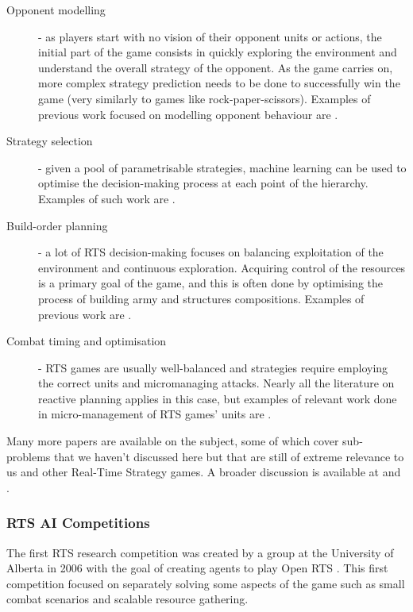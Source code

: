 \begin{description}
\item [Opponent modelling] - as players start with no vision of their opponent
  units or actions, the initial part of the game consists in quickly exploring
  the environment and understand the overall strategy of the opponent. As the
  game carries on, more complex strategy prediction needs to be done to
  successfully win the game (very similarly to games like rock-paper-scissors). 
  Examples of previous work focused on modelling opponent behaviour are
  \cite{dereszynski2011learning, schadd2007opponent, synnaeve2012special}.
\item [Strategy selection] - given a pool of parametrisable strategies, machine
  learning can be used to optimise the decision-making process at each point of
  the hierarchy. Examples of such work are \cite{ontanon2008learning,
    weber2010reactive, young2012evolutionary}.
\item [Build-order planning] - a lot of RTS decision-making focuses on balancing
  exploitation of the environment and continuous exploration. Acquiring control
  of the resources is a primary goal of the game, and this is often done by
  optimising the process of building army and structures compositions. Examples
  of previous work are \cite{churchill2011build, kovarsky2006first,
    weber2009case}.
\item [Combat timing and optimisation] - RTS games are usually well-balanced and
  strategies require employing the correct units and micromanaging attacks.
  Nearly all the literature on reactive planning applies in this case, but
  examples of relevant work done in micro-management of RTS games' units are
  \cite{balla2009uct, certicky2013case, kovarsky2005heuristic}. 
\end{description}

Many more papers are available on the subject, some of which cover sub-problems
that we haven't discussed here but that are still of extreme relevance to us and
other Real-Time Strategy games. A broader discussion is available at
\cite{ontanon2013survey} and \cite{churchill2016heuristic}.

\subsubsection{RTS AI Competitions}

The first RTS research competition was created by a group at the University of
Alberta in 2006 with the goal of creating agents to play Open RTS
\citep{buro2002orts}. This first competition focused on separately solving some
aspects of the game such as small combat scenarios and scalable resource
gathering. 

